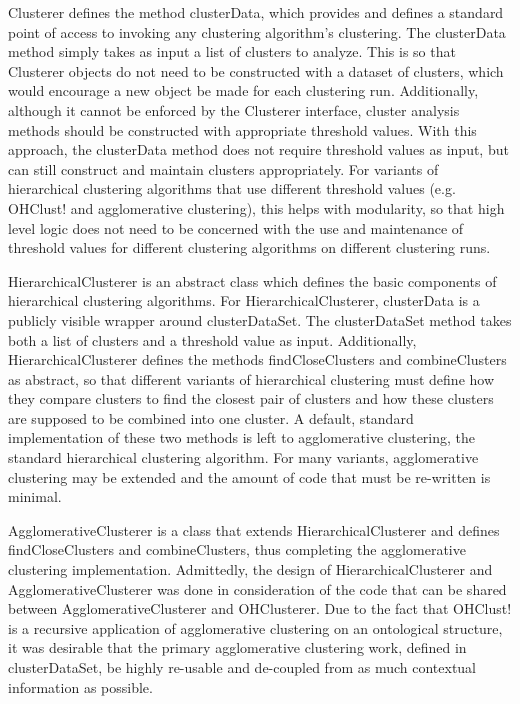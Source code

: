 \documentclass[12pt]{ucthesis}
\begin{document}
      Clusterer defines the method \textsf{clusterData}, which provides and defines a
      standard point of access to invoking any clustering algorithm's
      clustering. The \textsf{clusterData} method simply takes as input
      a list of clusters to analyze. This is so that Clusterer objects do not
      need to be constructed with a dataset of clusters, which would encourage
      a new object be made for each clustering run. Additionally, although it
      cannot be enforced by the Clusterer interface, cluster analysis methods
      should be constructed with appropriate threshold values. With this
      approach, the \textsf{clusterData} method does not require threshold
      values as input, but can still construct and maintain clusters
      appropriately. For variants of hierarchical clustering algorithms that
      use different threshold values (e.g. \textsf{OHClust!} and
      \textsf{agglomerative clustering}), this helps with modularity, so that
      high level logic does not need to be concerned with the use and
      maintenance of threshold values for different clustering algorithms on
      different clustering runs.

      HierarchicalClusterer is an abstract class which defines the basic
      components of hierarchical clustering algorithms. For
      HierarchicalClusterer, \textsf{clusterData} is a publicly visible
      wrapper around \textsf{clusterDataSet}. The \textsf{clusterDataSet}
      method takes both a list of clusters and a threshold value as input.
      Additionally, HierarchicalClusterer defines
      the methods \textsf{findCloseClusters} and \textsf{combineClusters} as
      abstract, so that different variants of \textsf{hierarchical
      clustering} must define how they compare clusters to find the closest
      pair of clusters and how these clusters are supposed to be combined
      into one cluster. A default, standard implementation of these two methods
      is left to \textsf{agglomerative clustering}, the standard hierarchical
      clustering algorithm. For many variants, \textsf{agglomerative
      clustering} may be extended and the amount of code that must be
      re-written is minimal.

      AgglomerativeClusterer is a class that extends HierarchicalClusterer and
      defines \textsf{findCloseClusters} and \textsf{combineClusters}, thus
      completing the \textsf{agglomerative clustering} implementation.
      Admittedly, the design of HierarchicalClusterer and
      AgglomerativeClusterer was done in consideration of the code that can be
      shared between AgglomerativeClusterer and OHClusterer. Due to the fact
      that \textsf{OHClust!} is a recursive application of
      \textsf{agglomerative clustering} on an ontological structure, it was
      desirable that the primary \textsf{agglomerative clustering} work,
      defined in \textsf{clusterDataSet}, be highly re-usable and de-coupled
      from as much contextual information as possible.
\end{document}
